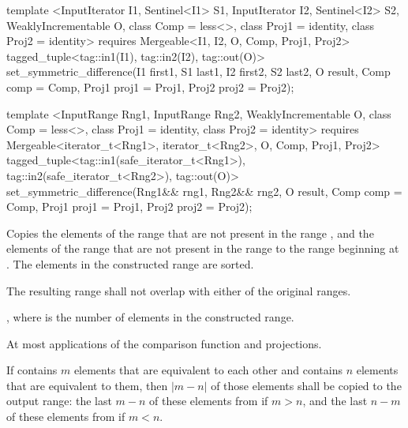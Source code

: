 %
\begin{itemdecl}
template <InputIterator I1, Sentinel<I1> S1, InputIterator I2, Sentinel<I2> S2,
    WeaklyIncrementable O, class Comp = less<>, class Proj1 = identity, class Proj2 = identity>
  requires Mergeable<I1, I2, O, Comp, Proj1, Proj2>
  tagged_tuple<tag::in1(I1), tag::in2(I2), tag::out(O)>
    set_symmetric_difference(I1 first1, S1 last1, I2 first2, S2 last2, O result,
                             Comp comp = Comp{}, Proj1 proj1 = Proj1{},
                             Proj2 proj2 = Proj2{});

template <InputRange Rng1, InputRange Rng2, WeaklyIncrementable O,
    class Comp = less<>, class Proj1 = identity, class Proj2 = identity>
  requires Mergeable<iterator_t<Rng1>, iterator_t<Rng2>, O, Comp, Proj1, Proj2>
  tagged_tuple<tag::in1(safe_iterator_t<Rng1>),
               tag::in2(safe_iterator_t<Rng2>),
               tag::out(O)>
    set_symmetric_difference(Rng1&& rng1, Rng2&& rng2, O result, Comp comp = Comp{},
                             Proj1 proj1 = Proj1{}, Proj2 proj2 = Proj2{});
\end{itemdecl}

\begin{itemdescr}
\pnum
\effects
Copies the elements of the range
that are not present in the range
,
and the elements of the range
that are not present in the range
to the range beginning at
.
The elements in the constructed range are sorted.

\pnum
\requires
The resulting range shall not overlap with either of the original ranges.

\pnum
\returns
{}, where  is
the number of elements in the constructed range.

\pnum
\complexity
At most
applications of the comparison function and projections.

\pnum
\notes
If  contains $m$ elements that are equivalent to each other and
 contains $n$ elements that are equivalent to them, then
$|m - n|$ of those elements shall be copied to the output range: the last
$m - n$ of these elements from  if $m > n$, and the last
$n - m$ of these elements from  if $m < n$.
\end{itemdescr}

